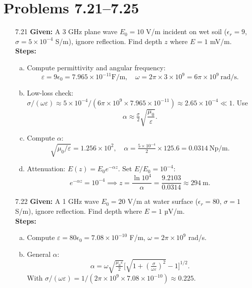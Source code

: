 \begin{enumerate}
\end{enumerate}

\section*{Problems 7.21--7.25}
\begin{enumerate}

\item[7.21] \textbf{Given:} A 3 GHz plane wave $E_0=10$ V/m incident on wet soil ($\epsilon_r=9$, $\sigma=5\times10^{-4}$ S/m), ignore reflection.  Find depth $z$ where $E=1$ mV/m.
\\
\textbf{Steps:}
\begin{enumerate}[(a)]
  \item Compute permittivity and angular frequency:
  \[\varepsilon=9\epsilon_0=7.965\times10^{-11}\mathrm{F/m},\quad
    \omega=2\pi\times3\times10^9=6\pi\times10^9~\mathrm{rad/s}.\]

  \item Low-loss check: $\sigma/(\omega\varepsilon)\approx5\times10^{-4}/(6\pi\times10^9\times7.965\times10^{-11})\approx2.65\times10^{-4}\ll1$.  Use
  \[\alpha\approx\tfrac{\sigma}{2}\sqrt{\frac{\mu_0}{\varepsilon}}.\]

  \item Compute $\alpha$:
  \[\sqrt{\mu_0/\varepsilon}=1.256\times10^2,\quad
    \alpha=\tfrac{5\times10^{-4}}{2}\times125.6=0.0314~\mathrm{Np/m}.\]

  \item Attenuation: $E(z)=E_0e^{-\alpha z}$.  Set $E/E_0=10^{-4}$:
  \[e^{-\alpha z}=10^{-4}\implies z=\frac{\ln10^4}{\alpha}=\frac{9.2103}{0.0314}\approx294~\mathrm m.\]
\end{enumerate}

\item[7.22] \textbf{Given:} A 1 GHz wave $E_0=20$ V/m at water surface ($\epsilon_r=80$, $\sigma=1$ S/m), ignore reflection.  Find depth where $E=1$ µV/m.
\\
\textbf{Steps:}
\begin{enumerate}[(a)]
  \item Compute $\varepsilon=80\epsilon_0=7.08\times10^{-10}$ F/m, $\omega=2\pi\times10^9$ rad/s.

  \item General $\alpha$:
  \[\alpha=\omega\sqrt{\tfrac{\mu_0\varepsilon}{2}}\bigl[\sqrt{1+(\tfrac{\sigma}{\omega\varepsilon})^2}-1\bigr]^{1/2}.\]
  With $\sigma/(\omega\varepsilon)=1/(2\pi\times10^9\times7.08\times10^{-10})\approx0.225$.


\end{enumerate}
\end{enumerate}
